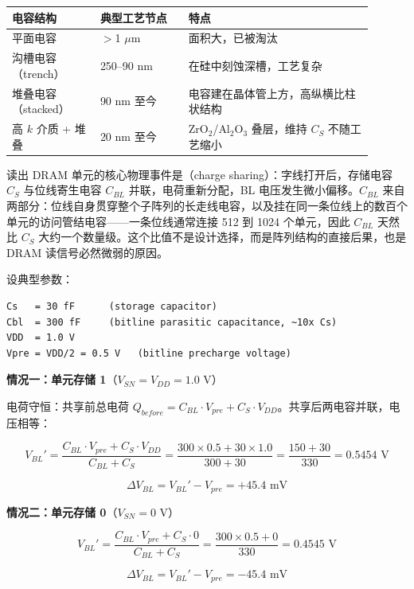 \begin{longtable}{L{0.22\linewidth}L{0.22\linewidth}L{0.46\linewidth}}
\toprule
电容结构 & 典型工艺节点 & 特点 \\
\midrule
平面电容 & $>$1 $\mu$m & 面积大，已被淘汰 \\\tablerowrule
沟槽电容（trench） & 250--90 nm & 在硅中刻蚀深槽，工艺复杂 \\\tablerowrule
堆叠电容（stacked） & 90 nm 至今 & 电容建在晶体管上方，高纵横比柱状结构 \\\tablerowrule
高 $k$ 介质 + 堆叠 & 20 nm 至今 & $\text{ZrO}_2$/$\text{Al}_2\text{O}_3$ 叠层，维持 $C_S$ 不随工艺缩小 \\
\bottomrule
\end{longtable}


读出 DRAM 单元的核心物理事件是（charge sharing）：字线打开后，存储电容 $C_S$ 与位线寄生电容 $C_{BL}$ 并联，电荷重新分配，BL 电压发生微小偏移。$C_{BL}$ 来自两部分：位线自身贯穿整个子阵列的长走线电容，以及挂在同一条位线上的数百个单元的访问管结电容——一条位线通常连接 512 到 1024 个单元，因此 $C_{BL}$ 天然比 $C_S$ 大约一个数量级。这个比值不是设计选择，而是阵列结构的直接后果，也是 DRAM 读信号必然微弱的原因。

设典型参数：
\begin{lstlisting}[numbers=none]
Cs   = 30 fF      (storage capacitor)
Cbl  = 300 fF     (bitline parasitic capacitance, ~10x Cs)
VDD  = 1.0 V
Vpre = VDD/2 = 0.5 V   (bitline precharge voltage)
\end{lstlisting}

\textbf{情况一：单元存储 1}（$V_{SN} = V_{DD} = 1.0$ V）

电荷守恒：共享前总电荷 $Q_{before} = C_{BL} \cdot V_{pre} + C_S \cdot V_{DD}$。共享后两电容并联，电压相等：

$$V_{BL}' = \frac{C_{BL} \cdot V_{pre} + C_S \cdot V_{DD}}{C_{BL} + C_S} = \frac{300 \times 0.5 + 30 \times 1.0}{300 + 30} = \frac{150 + 30}{330} = 0.5454 \text{ V}$$

$$\Delta V_{BL} = V_{BL}' - V_{pre} = +45.4 \text{ mV}$$

\textbf{情况二：单元存储 0}（$V_{SN} = 0$ V）

$$V_{BL}' = \frac{C_{BL} \cdot V_{pre} + C_S \cdot 0}{C_{BL} + C_S} = \frac{300 \times 0.5 + 0}{330} = 0.4545 \text{ V}$$

$$\Delta V_{BL} = V_{BL}' - V_{pre} = -45.4 \text{ mV}$$

